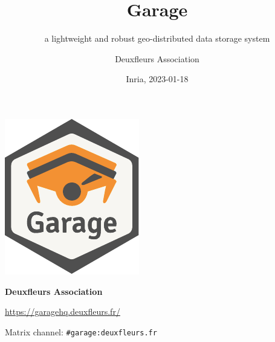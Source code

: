 \documentclass[aspectratio=169]{beamer}
\title{Garage}
\subtitle{a lightweight and robust geo-distributed data storage system}
\author{Deuxfleurs Association}
\date{Inria, 2023-01-18}
\begin{document}
\begin{frame}
	\centering
	\includegraphics[width=.3\linewidth]{../../sticker/Garage.pdf}
	\vspace{1em}

	{\large\bf Deuxfleurs Association}
	\vspace{1em}

	\url{https://garagehq.deuxfleurs.fr/}

	Matrix channel: \texttt{\#garage:deuxfleurs.fr}
\end{frame}
\end{document}
